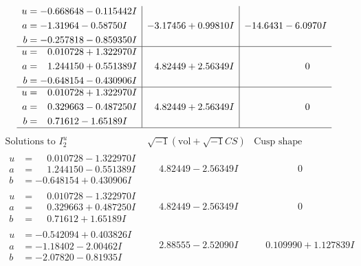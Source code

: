 \documentclass[1p]{elsarticle_modified}
\theoremstyle{definition}
\newcommand{\I}{\sqrt{-1}}
\begin{document}
$$\begin{array}{c|c|c}
\begin{aligned}
u &= -0.668648 - 0.115442 I \\
a &= -1.31964 - 0.58750 I \\
b &= -0.257818 - 0.859350 I\end{aligned}
 & -3.17456 + 0.99810 I & -14.6431 - 6.0970 I \\ \hline\begin{aligned}
u &= \phantom{-}0.010728 + 1.322970 I \\
a &= \phantom{-}1.244150 + 0.551389 I \\
b &= -0.648154 - 0.430906 I\end{aligned}
 & \phantom{-}4.82449 + 2.56349 I & \phantom{-0.000000 } 0 \\ \hline\begin{aligned}
u &= \phantom{-}0.010728 + 1.322970 I \\
a &= \phantom{-}0.329663 - 0.487250 I \\
b &= \phantom{-}0.71612 - 1.65189 I\end{aligned}
 & \phantom{-}4.82449 + 2.56349 I & \phantom{-0.000000 } 0\\
 \hline 
 \end{array}$$\newpage$$\begin{array}{c|c|c}  
\text{Solutions to }I^u_{2}& \I (\text{vol} + \sqrt{-1}CS) & \text{Cusp shape}\\
 \hline 
\begin{aligned}
u &= \phantom{-}0.010728 - 1.322970 I \\
a &= \phantom{-}1.244150 - 0.551389 I \\
b &= -0.648154 + 0.430906 I\end{aligned}
 & \phantom{-}4.82449 - 2.56349 I & \phantom{-0.000000 } 0 \\ \hline\begin{aligned}
u &= \phantom{-}0.010728 - 1.322970 I \\
a &= \phantom{-}0.329663 + 0.487250 I \\
b &= \phantom{-}0.71612 + 1.65189 I\end{aligned}
 & \phantom{-}4.82449 - 2.56349 I & \phantom{-0.000000 } 0 \\ \hline\begin{aligned}
u &= -0.542094 + 0.403826 I \\
a &= -1.18402 - 2.00462 I \\
b &= -2.07820 - 0.81935 I\end{aligned}
 & \phantom{-}2.88555 - 2.52090 I & \phantom{-}0.109990 + 1.127839 I \\ \hline\begin{aligned}

\end{aligned}
\end{array}$$
\end{document}
